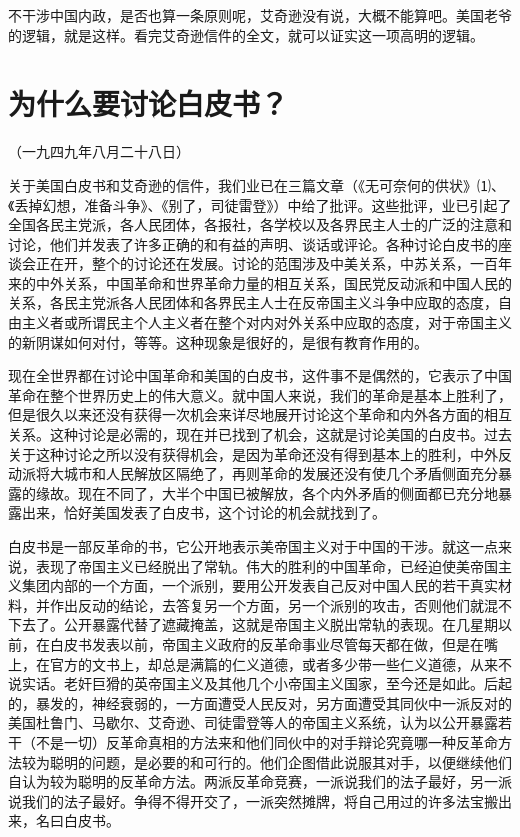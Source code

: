 \documentclass[UTF-8, a5paper, 12pt]{ctexart}
\begin{document}
不干涉中国内政，是否也算一条原则呢，艾奇逊没有说，大概不能算吧。美国老爷的逻辑，就是这样。看完艾奇逊信件的全文，就可以证实这一项高明的逻辑。

\section{为什么要讨论白皮书？}

（一九四九年八月二十八日）

关于美国白皮书和艾奇逊的信件，我们业已在三篇文章（《无可奈何的供状》⑴、《丢掉幻想，准备斗争》、《别了，司徒雷登》）中给了批评。这些批评，业已引起了全国各民主党派，各人民团体，各报社，各学校以及各界民主人士的广泛的注意和讨论，他们并发表了许多正确的和有益的声明、谈话或评论。各种讨论白皮书的座谈会正在开，整个的讨论还在发展。讨论的范围涉及中美关系，中苏关系，一百年来的中外关系，中国革命和世界革命力量的相互关系，国民党反动派和中国人民的关系，各民主党派各人民团体和各界民主人士在反帝国主义斗争中应取的态度，自由主义者或所谓民主个人主义者在整个对内对外关系中应取的态度，对于帝国主义的新阴谋如何对付，等等。这种现象是很好的，是很有教育作用的。

现在全世界都在讨论中国革命和美国的白皮书，这件事不是偶然的，它表示了中国革命在整个世界历史上的伟大意义。就中国人来说，我们的革命是基本上胜利了，但是很久以来还没有获得一次机会来详尽地展开讨论这个革命和内外各方面的相互关系。这种讨论是必需的，现在并已找到了机会，这就是讨论美国的白皮书。过去关于这种讨论之所以没有获得机会，是因为革命还没有得到基本上的胜利，中外反动派将大城市和人民解放区隔绝了，再则革命的发展还没有使几个矛盾侧面充分暴露的缘故。现在不同了，大半个中国已被解放，各个内外矛盾的侧面都已充分地暴露出来，恰好美国发表了白皮书，这个讨论的机会就找到了。

白皮书是一部反革命的书，它公开地表示美帝国主义对于中国的干涉。就这一点来说，表现了帝国主义已经脱出了常轨。伟大的胜利的中国革命，已经迫使美帝国主义集团内部的一个方面，一个派别，要用公开发表自己反对中国人民的若干真实材料，并作出反动的结论，去答复另一个方面，另一个派别的攻击，否则他们就混不下去了。公开暴露代替了遮藏掩盖，这就是帝国主义脱出常轨的表现。在几星期以前，在白皮书发表以前，帝国主义政府的反革命事业尽管每天都在做，但是在嘴上，在官方的文书上，却总是满篇的仁义道德，或者多少带一些仁义道德，从来不说实话。老奸巨猾的英帝国主义及其他几个小帝国主义国家，至今还是如此。后起的，暴发的，神经衰弱的，一方面遭受人民反对，另方面遭受其同伙中一派反对的美国杜鲁门、马歇尔、艾奇逊、司徒雷登等人的帝国主义系统，认为以公开暴露若干（不是一切）反革命真相的方法来和他们同伙中的对手辩论究竟哪一种反革命方法较为聪明的问题，是必要的和可行的。他们企图借此说服其对手，以便继续他们自认为较为聪明的反革命方法。两派反革命竞赛，一派说我们的法子最好，另一派说我们的法子最好。争得不得开交了，一派突然摊牌，将自己用过的许多法宝搬出来，名曰白皮书。
\end{document}
